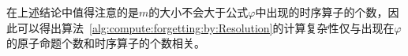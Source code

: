 在上述结论中值得注意的是$m$的大小不会大于公式$\varphi$中出现的时序算子的个数，因此可以得出算法~\ref{alg:compute:forgetting:by:Resolution}的计算复杂性仅与出现在$\varphi$的原子命题个数和时序算子的个数相关。

%
%
%
%
